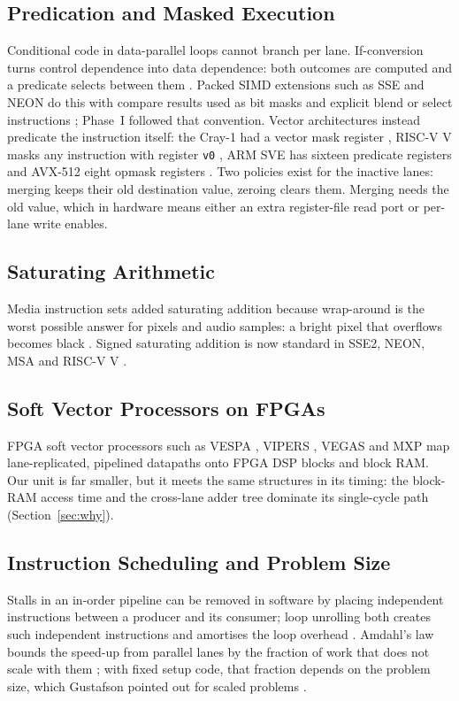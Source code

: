 \subsection{Predication and Masked Execution}
Conditional code in data-parallel loops cannot branch per lane. If-conversion turns
control dependence into data dependence: both outcomes are computed and a predicate
selects between them \cite{allen83}. Packed SIMD extensions such as SSE and NEON do
this with compare results used as bit masks and explicit blend or select instructions
\cite{sse, armarm}; Phase~I followed that convention. Vector architectures instead
predicate the instruction itself: the Cray-1 had a vector mask register \cite{cray1},
RISC-V V masks any instruction with register \texttt{v0} \cite{rvv}, ARM SVE has
sixteen predicate registers \cite{sve} and AVX-512 eight opmask registers \cite{intelsdm}.
Two policies exist for the inactive lanes: merging keeps their old destination value,
zeroing clears them. Merging needs the old value, which in hardware means either an
extra register-file read port or per-lane write enables.

\subsection{Saturating Arithmetic}
Media instruction sets added saturating addition because wrap-around is the worst
possible answer for pixels and audio samples: a bright pixel that overflows becomes
black \cite{mmx}. Signed saturating addition is now standard in SSE2, NEON, MSA and
RISC-V V \cite{intelsdm, armarm, msa, rvv}.

\subsection{Soft Vector Processors on FPGAs}
FPGA soft vector processors such as VESPA \cite{vespa}, VIPERS \cite{vipers}, VEGAS
\cite{vegas} and MXP \cite{mxp} map lane-replicated, pipelined datapaths onto FPGA DSP
blocks and block RAM. Our unit is far smaller, but it meets the same structures in its
timing: the block-RAM access time and the cross-lane adder tree dominate its
single-cycle path (Section~\ref{sec:why}).

\subsection{Instruction Scheduling and Problem Size}
Stalls in an in-order pipeline can be removed in software by placing independent
instructions between a producer and its consumer; loop unrolling both creates such
independent instructions and amortises the loop overhead \cite{dongarra79, hp6}.
Amdahl's law bounds the speed-up from parallel lanes by the fraction of work that does
not scale with them \cite{amdahl}; with fixed setup code, that fraction depends on the
problem size, which Gustafson pointed out for scaled problems \cite{gustafson}.

